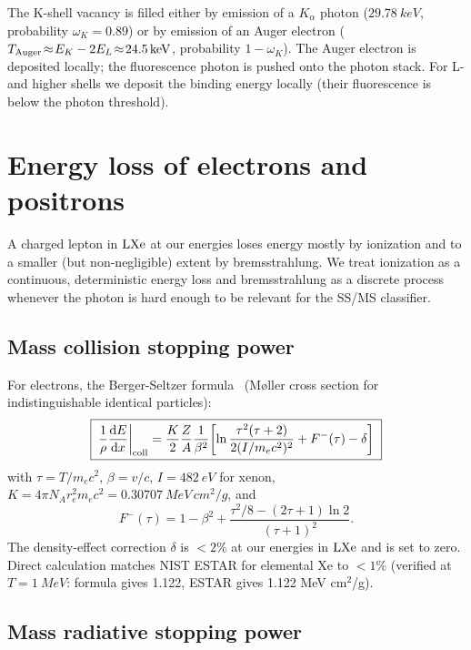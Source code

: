 \documentclass[11pt,a4paper]{article}
\newcommand{\me}{m_e c^2}
\newcommand{\re}{r_e}
\begin{document}
The K-shell vacancy is filled either by emission of a $K_\alpha$
photon ($\SI{29.78}{keV}$, probability $\omega_K=0.89$) or by
emission of an Auger electron ($T_{\rm Auger}\!\approx\!E_K-2E_L
\!\approx\!\SI{24.5}{keV}$, probability $1-\omega_K$). The Auger
electron is deposited locally; the fluorescence photon is pushed
onto the photon stack. For L- and higher shells we deposit the
binding energy locally (their fluorescence is below the photon
threshold).


\section{Energy loss of electrons and positrons}\label{sec:edE}

A charged lepton in $\rm LXe$ at our energies loses energy mostly
by ionization and to a smaller (but non-negligible) extent by
bremsstrahlung. We treat ionization as a continuous, deterministic
energy loss and bremsstrahlung as a discrete process whenever the
photon is hard enough to be relevant for the SS/MS classifier.

\subsection{Mass collision stopping power}

For electrons, the Berger-Seltzer
formula~\cite{ICRU37,Berger1964} (M\o{}ller cross section for
indistinguishable identical particles):
\begin{equation}
\boxed{\;
  \frac{1}{\rho}\dv{E}{x}\bigg|_{\rm coll}
  = \frac{K}{2}\frac{Z}{A}\frac{1}{\beta^2}
   \!\left[
     \ln\frac{\tau^2(\tau+2)}{2(I/\me)^2}
     + F^{-}(\tau) - \delta
   \right]
\;}
\end{equation}
with $\tau=T/\me$, $\beta=v/c$, $I=\SI{482}{eV}$ for xenon,
$K=4\pi N_A\re^2\me=\SI{0.30707}{MeV\,cm^2/g}$, and
\begin{equation}
  F^-(\tau) = 1-\beta^2 +\frac{\tau^2/8 - (2\tau+1)\ln 2}{(\tau+1)^2}.
\end{equation}
The density-effect correction $\delta$ is $<2\%$ at our energies
in $\rm LXe$ and is set to zero. Direct calculation matches NIST
ESTAR for elemental Xe to $<1\%$ (verified at $T=\SI{1}{MeV}$:
formula gives 1.122, ESTAR gives 1.122 MeV cm$^2$/g).

\subsection{Mass radiative stopping power}
\end{document}
